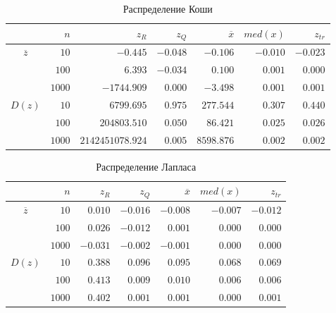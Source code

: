 \documentclass[report1.tex]{subfiles}
\begin{document}
\begin{table}[H]\label{table:cauchy}
\centering
\caption{Распределение Коши}
\begin{tabular}{c*6r}
\toprule
{} &         
$n$  & 
\centering $z_R$ & 
\centering $z_Q$ &
\centering $\overline{x}$& 
\centering $med(x)$ &
\centering $z_{tr}$ \tabularnewline
\midrule
\multirow{3}{*}{$\overline{z}$}
& $10$    & $-0.445$     & $-0.048$  & $-0.106$  & $-0.010$  & $-0.023$ \\
& $100$   & $ 6.393$     & $-0.034$  & $ 0.100$  & $ 0.001$  & $ 0.000$ \\
& $1000$  & $-1744.909$  & $ 0.000$  & $-3.498$  & $ 0.001$  & $ 0.001$ \\
\midrule
\multirow{3}{*}{$D(z)$}
& $10$    & $6799.695$        & $0.975$  & $277.544$   & $0.307$  & $0.440$ \\
& $100$   & $204803.510$      & $0.050$  & $86.421$    & $0.025$  & $0.026$ \\
& $1000$  & $2142451078.924$  & $0.005$  & $8598.876$  & $0.002$  & $0.002$ \\
\bottomrule
\end{tabular}
\end{table}

\begin{table}[H]\label{table:laplace}
\centering
\caption{Распределение Лапласа}
\begin{tabular}{c*6r}
\toprule
{} &         
$n$ & 
\centering $z_R$ & 
\centering $z_Q$ &
\centering $\overline{x}$& 
\centering $med(x)$ &
\centering $z_{tr}$ \tabularnewline
\midrule
\multirow{3}{*}{$\overline{z}$}
& $10$    & $ 0.010$  & $-0.016$  & $-0.008$  & $-0.007$  & $-0.012$ \\
& $100$   & $ 0.026$  & $-0.012$  & $ 0.001$  & $ 0.000$  & $ 0.000$ \\
& $1000$  & $-0.031$  & $-0.002$  & $-0.001$  & $ 0.000$  & $ 0.000$ \\
\midrule
\multirow{3}{*}{$D(z)$}
& $10$    & $0.388$  & $0.096$  & $0.095$  & $0.068$  & $0.069$ \\
& $100$   & $0.413$  & $0.009$  & $0.010$  & $0.006$  & $0.006$ \\
& $1000$  & $0.402$  & $0.001$  & $0.001$  & $0.000$  & $0.001$ \\
\bottomrule
\end{tabular}
\end{table}
\end{document}
